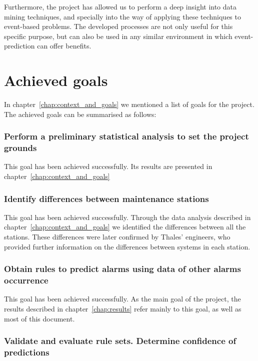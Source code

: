 Furthermore, the project has allowed us to perform a deep insight into data mining techniques, and specially into the way of applying these techniques to event-based problems. The developed processes are not only useful for this specific purpose, but can also be used in any similar environment in which event-prediction can offer benefits.



\section{Achieved goals}

In chapter~\ref{chap:context_and_goals} we mentioned a list of goals for the project. The achieved goals can be summarised as follows:

\subsubsection*{Perform a preliminary statistical analysis to set the project grounds}

This goal has been achieved successfully. Its results are presented in chapter~\ref{chap:context_and_goals}

\subsubsection*{Identify differences between maintenance stations}

This goal has been achieved successfully. Through the data analysis described in chapter~\ref{chap:context_and_goals} we identified the differences between all the stations. These differences were later confirmed by Thales' engineers, who provided further information on the differences between systems in each station.

\subsubsection*{Obtain rules to predict alarms using data of other alarms occurrence}

This goal has been achieved successfully. As the main goal of the project, the results described in chapter~\ref{chap:results} refer mainly to this goal, as well as most of this document.

\subsubsection*{Validate and evaluate rule sets. Determine confidence of predictions}

